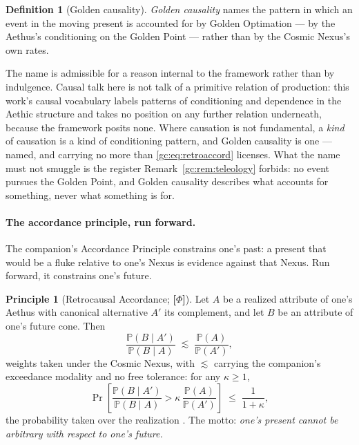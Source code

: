 \documentclass[11pt]{article}
\numberwithin{equation}{section}
\theoremstyle{plain}
\theoremstyle{definition}
\newtheorem{definition}[theorem]{Definition}
\newtheorem{principle}{Principle}
\theoremstyle{remark}
\newcommand{\PP}{\mathbb{P}}
\begin{document}
\begin{definition}[Golden causality]\label{gc:def:goldencausality}
\emph{Golden causality} names the pattern in which an event in the moving
present is accounted for by Golden Optimation --- by the Aethus's
conditioning on the Golden Point --- rather than by the Cosmic Nexus's
own rates.
\end{definition}

The name is admissible for a reason internal to the framework rather than
by indulgence. Causal talk here is not talk of a primitive relation of
production: this work's causal vocabulary labels patterns of conditioning
and dependence in the Aethic structure and takes no position on any
further relation underneath, because the framework posits none. Where
causation is not fundamental, a \emph{kind} of causation is a kind of
conditioning pattern, and Golden causality is one --- named, and carrying
no more than \eqref{gc:eq:retroaccord} licenses. What the name must not
smuggle is the register Remark~\ref{gc:rem:teleology} forbids: no event
pursues the Golden Point, and Golden causality describes what accounts
for something, never what something is for.

\paragraph{The accordance principle, run forward.} The companion's
Accordance Principle constrains one's past: a present that would be a
fluke relative to one's Nexus is evidence against that Nexus. Run
forward, it constrains one's future.

\begin{principle}[Retrocausal Accordance; \textbf{[$\Phi$]}]
\label{gc:prin:retroaccord}
Let $A$ be a realized attribute of one's Aethus with canonical
alternative $A'$ its complement, and let $B$ be an attribute of one's
future cone. Then
\begin{equation}\label{gc:eq:retroaccord}
\frac{\PP(B\mid A')}{\PP(B\mid A)}\;\lesssim\;\frac{\PP(A)}{\PP(A')},
\end{equation}
weights taken under the Cosmic Nexus, with $\lesssim$ carrying the
companion's exceedance modality and no free tolerance: for any
$\kappa\ge1$,
\begin{equation}\label{gc:eq:retroexceed}
\Pr\left[\frac{\PP(B\mid A')}{\PP(B\mid A)}
>\kappa\,\frac{\PP(A)}{\PP(A')}\right]\;\le\;\frac{1}{1+\kappa},
\end{equation}
the probability taken over the realization \cite{NexicFoundation}. The
motto: \emph{one's present cannot be arbitrary with respect to one's
future.}
\end{principle}
\end{document}
